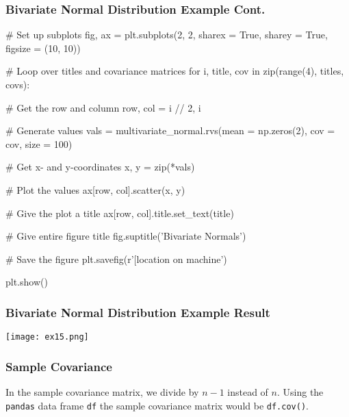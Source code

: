 \documentclass{beamer}
\begin{document}
\begin{frame}[fragile]
\frametitle{Bivariate Normal Distribution Example Cont.}
{
\linespread{0.8}
\tiny
\begin{verbatim*}
# Set up subplots
fig, ax = plt.subplots(2, 2, sharex = True, sharey = True, figsize = (10, 10))

# Loop over titles and covariance matrices 
for i, title, cov in zip(range(4), titles, covs):
    
    # Get the row and column
    row, col = i // 2, i % 2

    # Generate values
    vals = multivariate_normal.rvs(mean = np.zeros(2), cov = cov, size = 100)
    
    # Get x- and y-coordinates
    x, y = zip(*vals)
    
    # Plot the values
    ax[row, col].scatter(x, y)
    
    # Give the plot a title
    ax[row, col].title.set_text(title)

# Give entire figure title
fig.suptitle('Bivariate Normals')

# Save the figure
plt.savefig(r'[location on machine')

plt.show()
\end{verbatim*}
}

\end{frame}

\begin{frame}
\frametitle{Bivariate Normal Distribution Example Result}
\begin{center}
\texttt{[image: ex15.png]}
\end{center}
\end{frame}


\begin{frame}
\frametitle{Sample Covariance}
In the sample covariance matrix, we divide by $n-1$ instead of $n$. Using the \texttt{pandas} data frame \texttt{df} the sample covariance matrix would be  \texttt{df.cov()}.

\end{frame}
\end{document}

